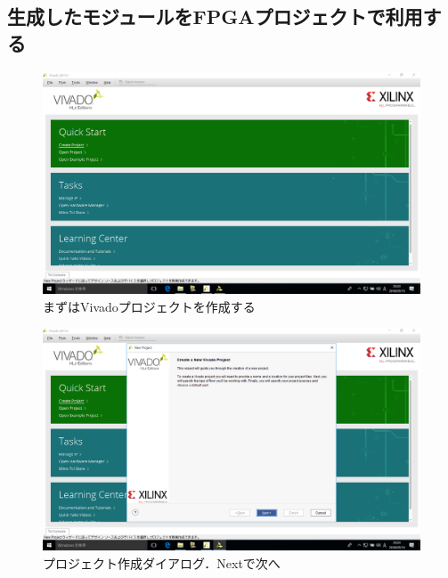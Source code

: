 \documentclass[a4paper,dvipdfmx]{jsarticle}
\begin{document}
 \subsection{生成したモジュールをFPGAプロジェクトで利用する}

 \begin{figure}[H]
  \begin{center}
   \includegraphics[width=.8\textwidth]{chapter08_figures/VirtualBox_Windows10_19_03_2018_23_23_11.png}
  \end{center}
  \caption{まずはVivadoプロジェクトを作成する}
 \end{figure}

 \begin{figure}[H]
  \begin{center}
   \includegraphics[width=.8\textwidth]{chapter08_figures/VirtualBox_Windows10_19_03_2018_23_23_20.png}
  \end{center}
  \caption{プロジェクト作成ダイアログ．Nextで次へ}
 \end{figure}
\end{document}
